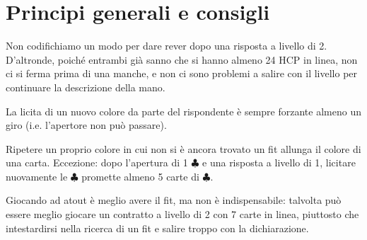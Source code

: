 \documentclass[a4paper,10pt]{article}
\renewcommand{\c}{$\clubsuit$\xspace}
\newcommand{\smallspace}{\vskip0.3cm}
\begin{document}
\section{Principi generali e consigli}

\indent

Non codifichiamo un modo per dare rever dopo una risposta a livello di 2. D'altronde, poiché entrambi già sanno che si hanno almeno 24 HCP in linea, non ci si ferma prima di una manche, e non ci sono problemi a salire con il livello per continuare la descrizione della mano.

\smallspace

La licita di un nuovo colore da parte del rispondente è sempre forzante almeno un giro (i.e. l'apertore non può passare).

\smallspace

Ripetere un proprio colore in cui non si è ancora trovato un fit allunga il colore di una carta. Eccezione: dopo l'apertura di 1 \c e una risposta a livello di 1, licitare nuovamente le \c promette almeno 5 carte di \c.
% 
% 
% 
\smallspace

Giocando ad atout è meglio avere il fit, ma non è indispensabile: talvolta può essere meglio giocare un contratto a livello di 2 con 7 carte in linea, piuttosto che intestardirsi nella ricerca di un fit e salire troppo con la dichiarazione.
\end{document}
